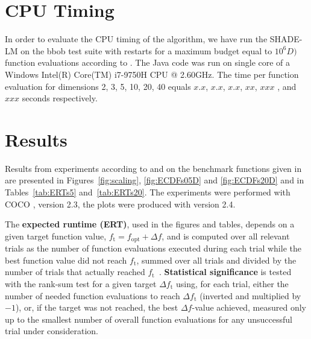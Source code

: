 \documentclass[sigconf]{acmart}
\newcommand{\Df}{\ensuremath{\Delta f}}
\newcommand{\fopt}{\ensuremath{f_\mathrm{opt}}}
\newcommand{\ftarget}{\ensuremath{f_\mathrm{t}}}
\newcommand{\change}[1]{{\color{red} #1}}
\begin{document}
\section{CPU Timing}
In order to evaluate the CPU timing of the algorithm, we have run the {SHADE-LM}
on the {bbob test suite \cite{hansen2010fun}} with restarts for a maximum budget
equal to {$10^6D)$} function evaluations according to \cite{hansen2016exp}.
The {Java} code was run on  single core of a {Windows Intel(R) Core(TM) i7-9750H CPU @ 2.60GHz}.
The time per function evaluation for dimensions 2, 3, 5, 10, 20, 40 equals \change{$x.x$}, \change{$x.x$}, \change{$x.x$}, \change{$xx$}, \change{$xxx$}\change{, and $xxx$} seconds respectively. 

\section{Results}

Results from experiments according to \cite{hansen2016exp} and \cite{hansen2016perfass} on the
benchmark functions given in \cite{wp200901_2010,hansen2010fun} are
presented in Figures~\ref{fig:scaling}, \ref{fig:ECDFs05D} and
\ref{fig:ECDFs20D} and in Tables~\ref{tab:ERTs5} and~\ref{tab:ERTs20}.
The experiments were performed with COCO \cite{hansen2020cocoplat}, version
{2.3}, the plots were produced with version {2.4}.

The \textbf{expected runtime (ERT)}, used in the figures and tables,
depends on a given target function value, $\ftarget=\fopt+\Df$, and is
computed over all relevant trials as the number of function
evaluations executed during each trial while the best function value
did not reach \ftarget, summed over all trials and divided by the
number of trials that actually reached \ftarget\
\cite{hansen2012exp,price1997dev}.  \textbf{Statistical significance}
is tested with the rank-sum test for a given target $\Delta\ftarget$
using, for each trial,
either the number of needed function evaluations to reach
$\Delta\ftarget$ (inverted and multiplied by $-1$), or, if the target
was not reached, the best $\Df$-value achieved, measured only up to
the smallest number of overall function evaluations for any
unsuccessful trial under consideration.
\end{document}

